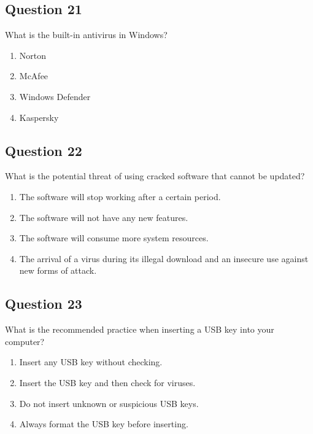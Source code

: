 \documentclass[12pt,a4paper]{article}
\begin{document}
\bigskip


\subsection*{Question 21}
What is the built-in antivirus in Windows?

\begin{enumerate}[label=\Alph*., leftmargin=*]
\item Norton
\item McAfee
\item Windows Defender
\item Kaspersky
\end{enumerate}

\bigskip


\subsection*{Question 22}
What is the potential threat of using cracked software that cannot be updated?

\begin{enumerate}[label=\Alph*., leftmargin=*]
\item The software will stop working after a certain period.
\item The software will not have any new features.
\item The software will consume more system resources.
\item The arrival of a virus during its illegal download and an insecure use against new forms of attack.
\end{enumerate}

\bigskip


\subsection*{Question 23}
What is the recommended practice when inserting a USB key into your computer?

\begin{enumerate}[label=\Alph*., leftmargin=*]
\item Insert any USB key without checking.
\item Insert the USB key and then check for viruses.
\item Do not insert unknown or suspicious USB keys.
\item Always format the USB key before inserting.
\end{enumerate}
\end{document}
